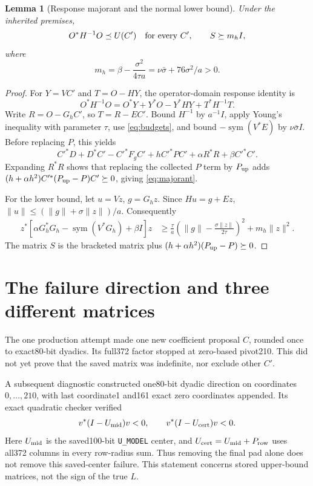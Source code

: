 \documentclass[11pt,a4paper]{article}
\newcommand{\sym}{\operatorname{sym}}
\newcommand{\norm}[1]{\lVert #1\rVert}
\newtheorem{lemma}[theorem]{Lemma}
\theoremstyle{definition}
\theoremstyle{remark}
\numberwithin{equation}{section}
\begin{document}
\begin{lemma}[Response majorant and the normal lower bound]\label{lem:response}
Under the inherited premises,
\begin{equation}\label{eq:response}
 O^*H^{-1}O\preceq U(C')\quad\hbox{for every }C',
 \qquad S\succeq m_hI,
\end{equation}
where
\begin{equation}\label{eq:mh}
 m_h=\beta-\frac{\sigma^2}{4\tau a}
     =\nu\bar\sigma+76\sigma^2/a>0.
\end{equation}
\end{lemma}
\begin{proof}
For $Y=VC'$ and $T=O-HY$, the operator-domain response identity is
\[
 O^*H^{-1}O=O^*Y+Y^*O-Y^*HY+T^*H^{-1}T.
\]
Write $R=O-G_hC'$, so $T=R-EC'$. Bound $H^{-1}$ by $a^{-1}I$,
apply Young's inequality with parameter $\tau$, use \eqref{eq:budgets},
and bound $-\sym(V^*E)$ by $\nu\bar\sigma I$.
Before replacing $P$, this yields
\[
 C'^*D+D^*C'-C'^*F_gC'+hC'^*PC'
       +\alpha R^*R+\beta C'^*C'.
\]
Expanding $R^*R$ shows that replacing the collected $P$ term by
$P_{\rm up}$ adds $(h+\alpha h^2)C'^*(P_{\rm up}-P)C'\succeq0$,
giving \eqref{eq:majorant}.

For the lower bound, let $u=Vz$, $g=G_hz$. Since $Hu=g+Ez$,
$\norm u\le(\norm g+\sigma\norm z)/a$. Consequently
\begin{align*}
 z^*[\alpha G_h^*G_h-\sym(V^*G_h)+\beta I]z
 &\ge\frac\tau a\left(\norm g-\frac{\sigma\norm z}{2\tau}\right)^2
       +m_h\norm z^2.
\end{align*}
The matrix $S$ is the bracketed matrix plus
$(h+\alpha h^2)(P_{\rm up}-P)\succeq0$.
\end{proof}

\section{The failure direction and three different matrices}

The one production attempt made one new coefficient proposal $C$,
rounded once to exact80-bit dyadics. Its full372 factor stopped at
zero-based pivot210. This did not yet prove that the saved matrix was
indefinite, nor exclude other $C'$.

A subsequent diagnostic constructed one80-bit dyadic direction on
coordinates $0,\ldots,210$, with last coordinate1 and161 exact zero
coordinates appended. Its exact quadratic checker verified
\begin{equation}\label{eq:witness}
 v^*(I-U_{\rm mid})v<0,\qquad v^*(I-U_{\rm cert})v<0.
\end{equation}
Here $U_{\rm mid}$ is the saved100-bit \texttt{U\_MODEL} center, and
$U_{\rm cert}=U_{\rm mid}+P_{\rm row}$ uses all372 columns in every
row-radius sum. Thus removing the final pad alone does not remove this
saved-center failure. This statement concerns stored upper-bound matrices,
not the sign of the true $L$.
\end{document}
